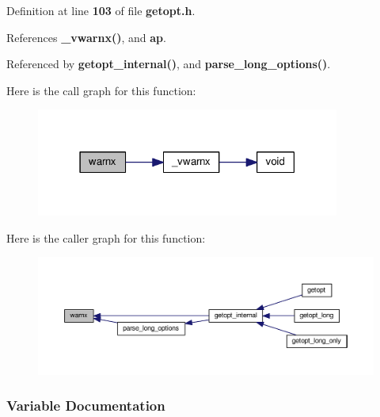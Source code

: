 Definition at line {\bf 103} of file {\bf getopt.\+h}.



References {\bf \+\_\+vwarnx()}, and {\bf ap}.



Referenced by {\bf getopt\+\_\+internal()}, and {\bf parse\+\_\+long\+\_\+options()}.



Here is the call graph for this function\+:
\nopagebreak
\begin{figure}[H]
\begin{center}
\leavevmode
\includegraphics[width=283pt]{df/da5/soapysdr_2apps_2msvc_2getopt_8h_acece1548dfba3be0fbea0cbd38959768_cgraph}
\end{center}
\end{figure}




Here is the caller graph for this function\+:
\nopagebreak
\begin{figure}[H]
\begin{center}
\leavevmode
\includegraphics[width=350pt]{df/da5/soapysdr_2apps_2msvc_2getopt_8h_acece1548dfba3be0fbea0cbd38959768_icgraph}
\end{center}
\end{figure}




\subsubsection{Variable Documentation}
